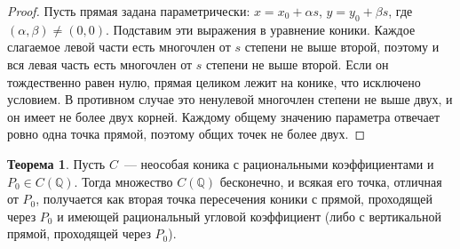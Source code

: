 \documentclass[a4paper,14pt]{extreport}
\theoremstyle{definition}
\newtheorem{thm}{Теорема}[chapter]
\newcommand{\Q}{\mathbb{Q}}
\begin{document}
\begin{proof}
Пусть прямая задана параметрически: $x=x_0+\alpha s$, $y=y_0+\beta s$, где
$(\alpha,\beta)\neq(0,0)$. Подставим эти выражения в уравнение коники. Каждое
слагаемое левой части есть многочлен от $s$ степени не выше второй, поэтому и
вся левая часть есть многочлен от $s$ степени не выше второй. Если он
тождественно равен нулю, прямая целиком лежит на конике, что исключено условием.
В противном случае это ненулевой многочлен степени не выше двух, и он имеет не
более двух корней. Каждому общему значению параметра отвечает ровно одна точка
прямой, поэтому общих точек не более двух.
\end{proof}

\begin{thm}\label{thm:main}
Пусть $C$~--- неособая коника с рациональными коэффициентами и
$P_0\in C(\Q)$. Тогда множество $C(\Q)$ бесконечно, и всякая его точка,
отличная от $P_0$, получается как вторая точка пересечения коники с прямой,
проходящей через $P_0$ и имеющей рациональный угловой коэффициент (либо с
вертикальной прямой, проходящей через $P_0$).
\end{thm}
\end{document}
